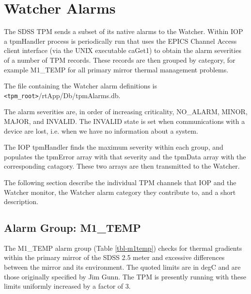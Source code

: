 \section{Watcher Alarms}

The SDSS TPM sends a subset of its native alarms to the Watcher. 
Within IOP a tpmHandler process is periodically run that uses the 
EPICS Channel Access client interface (via the UNIX executable caGet1) 
to obtain the alarm severities of a number of TPM records. These records 
are then grouped by category, for example M1\_TEMP for all primary mirror 
thermal management problems.

The file containing the Watcher alarm definitions is
{\tt<tpm\_root>}/rtApp/Db/tpmAlarms.db. 

The alarm severities are, in order of increasing criticality, NO\_ALARM, 
MINOR, MAJOR, and INVALID. The INVALID state is set when communications 
with a device are lost, i.e. when we have no information about a system.

The IOP tpmHandler finds the maximum severity within each group, 
and populates the tpmError array with that severity and the tpmData 
array with the corresponding catagory. These two arrays are then 
transmitted to the Watcher.

The following section describe the individual TPM channels that IOP and 
the Watcher monitor, the Watcher alarm category they contribute to, 
and a short description.

\subsection{Alarm Group: M1\_TEMP}

The M1\_TEMP alarm group (Table \ref{tbl-m1temp})  checks 
for thermal gradients within the 
primary mirror of the SDSS 2.5 meter and excessive differences 
between the mirror and its environment. The quoted limits are in
degC and are those originally specified by Jim Gunn. The TPM 
is presently running with these limits uniformly increased by a factor of 3.

